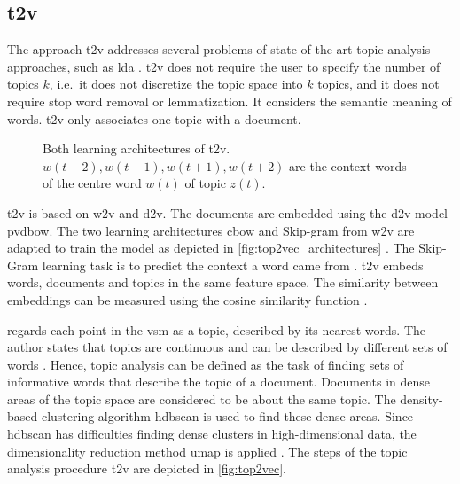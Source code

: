 \subsection{\acl*{t2v}}\label{subsec:top2vec}

The approach \acf{t2v} addresses several problems of state-of-the-art topic analysis approaches, such as \ac{lda} \cite{Top2Vec2020}.
\ac{t2v} does not require the user to specify the number of topics $k$, 
i.e.\ it does not discretize the topic space into $k$ topics, 
and it does not require stop word removal or lemmatization.
It considers the semantic meaning of words.
\ac{t2v} only associates one topic with a document.

\begin{figure}[!htp]%
    \centering
    \qquad
    \caption[Two learning architectures of \acs*{t2v}]{Both learning architectures of \acs*{t2v}.
    $w(t-2), w(t-1), w(t+1), w(t+2)$ are the context words of the centre word $w(t)$ of topic $z(t)$.
    }%
    \label{fig:top2vec_architectures}%
\end{figure}

\ac{t2v} is based on \ac{w2v} and \ac{d2v}.
The documents are embedded using the \ac{d2v} model \ac{pvdbow}.
The two learning architectures \ac{cbow} and Skip-gram from \ac{w2v} are adapted to train the model as depicted in \autoref{fig:top2vec_architectures} \cite{Topic2Vec2015}.
The Skip-Gram learning task is to predict the context a word came from \cite{Top2Vec2020, Topic2Vec2015}.
\ac{t2v} embeds words, documents and topics in the same feature space.
The similarity between embeddings can be measured using the cosine similarity function \cite{Topic2Vec2015}.

\citeauthor{Top2Vec2020} regards each point in the \ac{vsm} as a topic, described by its nearest words.
The author states that topics are continuous and can be described by different sets of words \cite{Top2Vec2020}.
Hence, topic analysis can be defined as the task of finding sets of informative words that describe the topic of a document.
Documents in dense areas of the topic space are considered to be about the same topic.
The density-based clustering algorithm \ac{hdbscan} is used to find these dense areas.
Since \ac{hdbscan} has difficulties finding dense clusters in high-dimensional data, 
the dimensionality reduction method \ac{umap} is applied \cite{Top2Vec2020}.
The steps of the topic analysis procedure \ac{t2v} are depicted in \autoref{fig:top2vec}.

